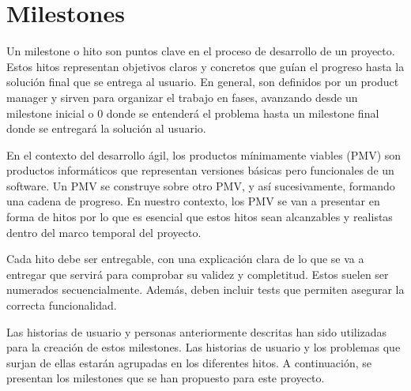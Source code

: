 \section{Milestones}

Un milestone o hito son puntos clave en el proceso de desarrollo de un proyecto. Estos hitos representan objetivos claros y concretos que guían el progreso hasta la solución final que se entrega al usuario. En general, son definidos por un product manager y sirven para organizar el trabajo en fases, avanzando desde un milestone inicial o 0 donde se entenderá el problema hasta un milestone final donde se entregará la solución al usuario.

En el contexto del desarrollo ágil, los productos mínimamente viables (PMV) son productos informáticos que representan versiones básicas pero funcionales de un software. Un PMV se construye sobre otro PMV, y así sucesivamente, formando una cadena de progreso. En nuestro contexto, los PMV se van a presentar en forma de hitos por lo que es esencial que estos hitos sean alcanzables y realistas dentro del marco temporal del proyecto.

Cada hito debe ser entregable, con una explicación clara de lo que se va a entregar que servirá para comprobar su validez y completitud. Estos suelen ser numerados secuencialmente. Además, deben incluir tests que permiten asegurar la correcta funcionalidad.

Las historias de usuario y personas anteriormente descritas han sido utilizadas para la creación de estos milestones. Las historias de usuario y los problemas que surjan de ellas estarán agrupadas en los diferentes hitos. A continuación, se presentan los milestones que se han propuesto para este proyecto.


